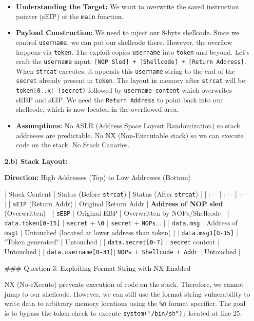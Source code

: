 \documentclass{article}
\begin{document}
\begin{itemize}
    \item[\textbf{1.}] \textbf{Understanding the Target:} We want to overwrite the saved instruction pointer (sEIP) of the \texttt{main} function.
    \item[\textbf{2.}] \textbf{Payload Construction:} We need to inject our 8-byte shellcode. Since we control \texttt{username}, we can put our shellcode there. However, the overflow happens via \texttt{token}. The exploit copies \texttt{username} into \texttt{token} and beyond. Let's craft the \texttt{username} input: \texttt{[NOP Sled] + [Shellcode] + [Return Address]}. When \texttt{strcat} executes, it appends this \texttt{username} string to the end of the \texttt{secret} already present in \texttt{token}. The layout in memory after \texttt{strcat} will be: \texttt{token[0..x] (secret)} followed by \texttt{username\_content} which overwrites sEBP and sEIP. We need the \texttt{Return Address} to point back into our shellcode, which is now located in the overflowed area.
    \item[\textbf{3.}] \textbf{Assumptions:} No ASLR (Address Space Layout Randomization) so stack addresses are predictable. No NX (Non-Executable stack) so we can execute code on the stack. No Stack Canaries.

\end{itemize}
\textbf{2.b) Stack Layout:}

\textbf{Direction:} High Addresses (Top) to Low Addresses (Bottom)

| Stack Content | Status (Before \texttt{strcat}) | Status (After \texttt{strcat}) |
| :--- | :--- | :--- |
| \texttt{sEIP} (Return Addr) | Original Return Addr | \textbf{Address of NOP sled} (Overwritten) |
| \texttt{sEBP} | Original EBP | Overwritten by NOPs/Shellcode |
| \texttt{data.token[0-15]} | \texttt{secret} + \texttt{\textbackslash{}0} | \texttt{secret} + \texttt{NOPs}... |
| \texttt{data.msg} | Address of \texttt{msg1} | Untouched (located at lower address than token) |
| \texttt{data.msg1[0-15]} | "Token generated" | Untouched |
| \texttt{data.secret[0-7]} | \texttt{secret} content | Untouched |
| \texttt{data.username[0-31]}| \texttt{NOPs + Shellcode + Addr} | Untouched |

\#\#\# Question 3: Exploiting Format String with NX Enabled

NX (No-eXecute) prevents execution of code on the stack. Therefore, we cannot jump to our shellcode. However, we can still use the format string vulnerability to write data to arbitrary memory locations using the \texttt{\%n} format specifier. The goal is to bypass the token check to execute \texttt{system("/bin/sh");} located at line 25.
\end{document}
